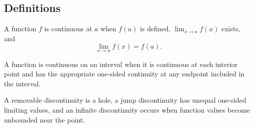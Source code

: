 \subsection*{Definitions}

\begin{definition*}
A function \(f\) is continuous at \(a\) when \(f(a)\) is defined,
\(\lim_{x\to a}f(x)\) exists, and
\[
  \lim_{x\to a}f(x)=f(a).
\]
\end{definition*}

\begin{definition*}
A function is continuous on an interval when it is continuous at each interior
point and has the appropriate one-sided continuity at any endpoint included in
the interval.
\end{definition*}

\begin{definition*}
A removable discontinuity is a hole, a jump discontinuity has unequal
one-sided limiting values, and an infinite discontinuity occurs when function
values become unbounded near the point.
\end{definition*}

